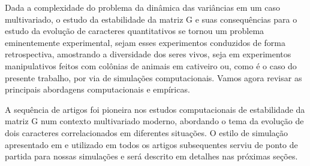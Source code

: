 
Dada a complexidade do problema da dinâmica das variâncias em um caso
multivariado, o estudo da estabilidade da matriz G e suas consequências
para o estudo da evolução de caracteres quantitativos se tornou um
problema eminentemente experimental, sejam esses experimentos conduzidos
de forma retrospectiva, amostrando a diversidade dos seres vivos, seja
em experimentos manipulativos feitos com colônias de animais em
cativeiro ou, como é o caso do presente trabalho, por via de simulações
computacionais. 
Vamos agora revisar as principais abordagens computacionais e empíricas. 

A sequência de artigos \cite{Jones2003, Jones2004, Jones2007} foi
pioneira nos estudos computacionais de estabilidade da matriz G num
contexto multivariado moderno, abordando o tema da evolução de dois
caracteres correlacionados em diferentes situações. 
O estilo de simulação apresentado em \cite{Jones2003} e utilizado em
todos os artigos subsequentes serviu de ponto de partida para nossas
simulações e será descrito em detalhes nas próximas seções. 

